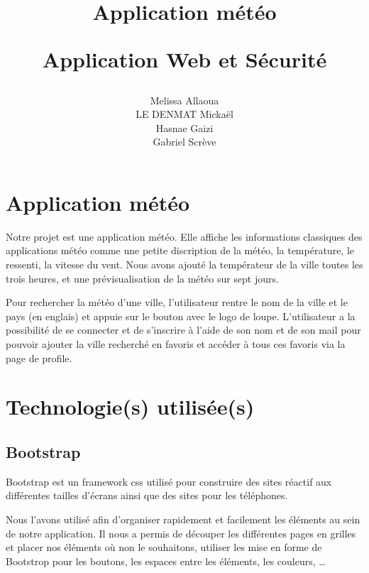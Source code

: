 \documentclass[a4paper, 12pt, french]{article}
\title{
	\Huge
	\textbf{Application météo}
	\vspace{0.4cm}

	\LARGE
	Application Web et Sécurité
}
\author{
	Melissa Allaoua \\
	LE DENMAT Mickaël \\
	Hasnae Gaizi \\
	Gabriel Scrève
}
\begin{document}
	

	\newpage
	\renewcommand{\contentsname}{Table des matières}
	\tableofcontents

	\newpage
	\section{Application météo}
		Notre projet est une application météo. Elle affiche les informations classiques 
    	des applications météo comme une petite discription de la météo, la température,
		le ressenti, la vitesse du vent. Nous avons ajouté la températeur de 
   		la ville toutes les trois heures, et une prévisualisation de la météo sur sept jours.

		Pour rechercher la météo d'une ville, l'utilisateur rentre le nom de la ville et le pays
    	(en englais) et appuie sur le bouton avec le logo de loupe.
		L'utilisateur a la possibilité de se connecter et de s'inscrire à l'aide de son nom et de son
    	mail pour pouvoir ajouter la ville recherché en favoris et accéder à tous ces favoris via
    	la page de profile.

	\section{Technologie(s) utilisée(s)}
		\subsection{Bootstrap}
			Bootstrap est un framework css \cite*{Bootstrap} utilisé pour construire des sites
			réactif aux différentes tailles d'écrans ainsi que des sites pour les
			téléphones.

			Nous l'avons utilisé afin d'organiser rapidement et facilement
			les éléments au sein de notre application. Il nous a permis de
     		découper les différentes pages en grilles et placer nos éléments où non le
			souhaitons, utiliser les mise en forme de Bootstrop pour les boutons,
			les espaces entre les éléments, les couleurs, \ldots
\end{document}
